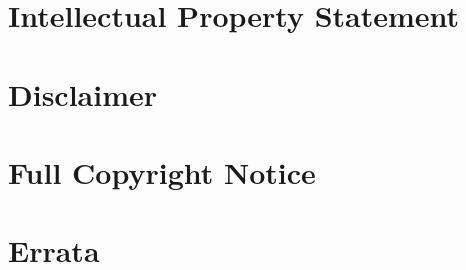 \documentclass[10pt,a4paper]{article}
\begin{document}
\section{Intellectual Property Statement}


\section{Disclaimer}


\section{Full Copyright Notice}





\appendix

\newpage
\section{Errata}
\label{sec:errata}
\end{document}
